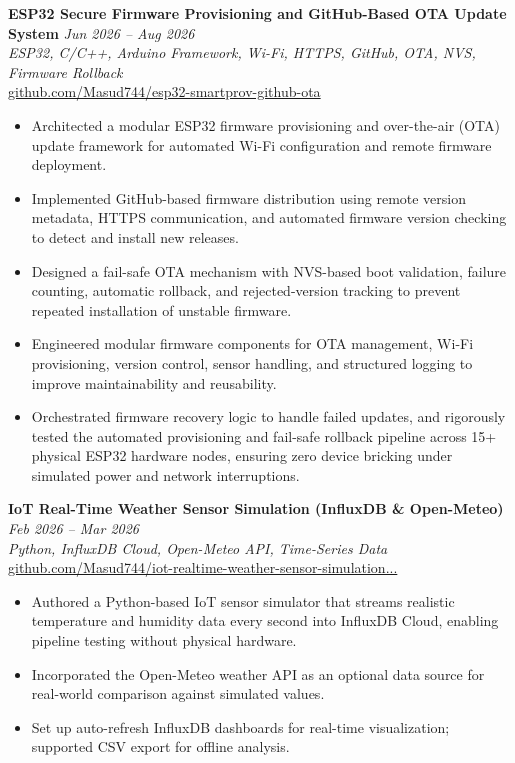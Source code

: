 \documentclass[11pt,a4paper]{article}
\begin{document}
\textbf{ESP32 Secure Firmware Provisioning and GitHub-Based OTA Update System} \hfill \textit{Jun 2026 -- Aug 2026} \\
\textit{ESP32, C/C++, Arduino Framework, Wi-Fi, HTTPS, GitHub, OTA, NVS, Firmware Rollback} \\
\href{https://github.com/Masud744/esp32-smartprov-github-ota}{github.com/Masud744/esp32-smartprov-github-ota}
\begin{itemize}
    \item Architected a modular ESP32 firmware provisioning and over-the-air (OTA) update framework for automated Wi-Fi configuration and remote firmware deployment.
    \item Implemented GitHub-based firmware distribution using remote version metadata, HTTPS communication, and automated firmware version checking to detect and install new releases.
    \item Designed a fail-safe OTA mechanism with NVS-based boot validation, failure counting, automatic rollback, and rejected-version tracking to prevent repeated installation of unstable firmware.
    \item Engineered modular firmware components for OTA management, Wi-Fi provisioning, version control, sensor handling, and structured logging to improve maintainability and reusability.
    \item Orchestrated firmware recovery logic to handle failed updates, and rigorously tested the automated provisioning and fail-safe rollback pipeline across 15+ physical ESP32 hardware nodes, ensuring zero device bricking under simulated power and network interruptions.
\end{itemize}

\textbf{IoT Real-Time Weather Sensor Simulation (InfluxDB \& Open-Meteo)} \hfill \textit{Feb 2026 -- Mar 2026} \\
\textit{Python, InfluxDB Cloud, Open-Meteo API, Time-Series Data} \\
\href{https://github.com/Masud744/iot-realtime-weather-sensor-simulation-influxdb-open-meteo}{github.com/Masud744/iot-realtime-weather-sensor-simulation...}
\begin{itemize}
    \item Authored a Python-based IoT sensor simulator that streams realistic temperature and humidity data every second into InfluxDB Cloud, enabling pipeline testing without physical hardware.
    \item Incorporated the Open-Meteo weather API as an optional data source for real-world comparison against simulated values.
    \item Set up auto-refresh InfluxDB dashboards for real-time visualization; supported CSV export for offline analysis.
\end{itemize}
\end{document}

